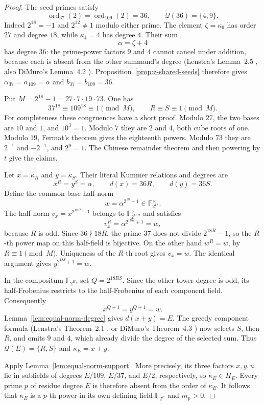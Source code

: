 \documentclass[11pt]{article}
\theoremstyle{definition}
\theoremstyle{remark}
\begin{document}
\begin{proof}
The seed primes satisfy
\[
 \operatorname{ord}_{37}(2)=\operatorname{ord}_{109}(2)=36,
 \qquad \mathcal Q(36)=\{4,9\}.
\]
Indeed $2^{18}=-1$ and $2^{12}\ne1$ modulo either prime.  The element
$\zeta=\kappa_9$ has order $27$ and degree $18$, while $\kappa_4=4$ has
degree $4$.  Their sum
\[
 \alpha=\zeta+4
\]
has degree $36$: the prime-power factors $9$ and $4$ cannot cancel under
addition, because each is absent from the other summand's degree
(Lenstra's Lemma~2.5 \cite{lenstra1977}, also DiMuro's Lemma~4.2
\cite{dimuro2011}).  Proposition~\ref{prop:z-shared-seeds} therefore
gives $\alpha_{37}=\alpha_{109}=\alpha$ and $b_{37}=b_{109}=36$.

Put $M=2^{18}-1=27\cdot7\cdot19\cdot73$.  One has
\[
 37^{18}\equiv109^{18}\equiv1\pmod M,
 \qquad R\equiv S\equiv1\pmod M.
\]
For completeness these congruences have a short proof.  Modulo $27$, the
two bases are $10$ and $1$, and $10^3=1$.  Modulo $7$ they are $2$ and $4$,
both cube roots of one.  Modulo $19$, Fermat's theorem gives the eighteenth
powers.  Modulo $73$ they are $2^{-1}$ and $-2^{-1}$, and $2^9=1$.
The Chinese remainder theorem and then powering by $t$ give the claims.

Let $x=\kappa_R$ and $y=\kappa_S$.  Their literal Kummer relations and
degrees are
\[
 x^R=y^S=\alpha,\qquad d(x)=36R,\qquad d(y)=36S.
\]
Define the common base half-norm
\[
 w=\alpha^{2^{18}+1}\in\mathbb F_{2^{18}}^\times.
\]
The half-norm
$v_x=x^{2^{18R}+1}$ belongs to $\mathbb F_{2^{18R}}^\times$ and satisfies
\[
 v_x^R=\alpha^{2^{18R}+1}=w,
\]
because $R$ is odd.  Since $36\nmid18R$, the prime $37$ does not divide
$2^{18R}-1$, so the $R$-th power map on this half-field is bijective.
On the other hand $w^R=w$, by $R\equiv1\pmod M$.  Uniqueness of the
$R$-th root gives $v_x=w$.  The identical argument gives
$y^{2^{18S}+1}=w$.

In the compositum $\mathbb F_{2^E}$, set $Q=2^{18RS}$.  Since the other
tower degree is odd, its half-Frobenius restricts to the half-Frobenius of
each component field.  Consequently
\[
 x^{Q+1}=y^{Q+1}=w.
\]
Lemma~\ref{lem:equal-norm-degree} gives $d(x+y)=E$.  The greedy
component formula (Lenstra's Theorem~2.1 \cite{lenstra1977}, or DiMuro's
Theorem~4.3 \cite{dimuro2011}) now selects $S$, then
$R$, and omits $9$ and $4$, which already divide the degree of the selected
sum.  Thus $\mathcal Q(E)=\{R,S\}$ and $\kappa_E=x+y$.

Apply Lemma~\ref{lem:equal-norm-support}.  More precisely, its three factors
$x,y,u$ lie in subfields of degrees $E/109$, $E/37$, and $E/2$, respectively,
so $\kappa_E\in H_E$.  Every prime $p$ of residue degree $E$ is therefore
absent from the order of $\kappa_E$.  It follows that $\kappa_E$ is a
$p$-th power in its own defining field $\mathbb F_{2^E}$ and $m_p>0$.
\end{proof}
\end{document}
